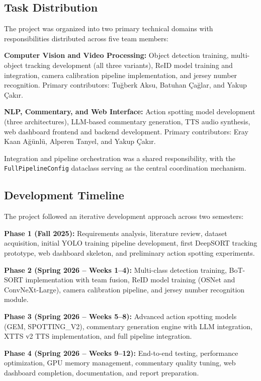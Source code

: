 \documentclass[10pt,twocolumn,a4paper]{article}
\begin{document}
\subsection{Task Distribution}

The project was organized into two primary technical domains with responsibilities distributed across five team members:

\textbf{Computer Vision and Video Processing:} Object detection training, multi-object tracking development (all three variants), ReID model training and integration, camera calibration pipeline implementation, and jersey number recognition. Primary contributors: Tu\u{g}berk Aksu, Batuhan \c{C}a\u{g}lar, and Yakup \c{C}ak{\i}r.

\textbf{NLP, Commentary, and Web Interface:} Action spotting model development (three architectures), LLM-based commentary generation, TTS audio synthesis, web dashboard frontend and backend development. Primary contributors: Eray Kaan A\u{g}\"unl\"u, Alperen Tanyel, and Yakup \c{C}ak{\i}r.

Integration and pipeline orchestration was a shared responsibility, with the \texttt{FullPipelineConfig} dataclass serving as the central coordination mechanism.

\subsection{Development Timeline}

The project followed an iterative development approach across two semesters:

\textbf{Phase 1 (Fall 2025):} Requirements analysis, literature review, dataset acquisition, initial YOLO training pipeline development, first DeepSORT tracking prototype, web dashboard skeleton, and preliminary action spotting experiments.

\textbf{Phase 2 (Spring 2026 -- Weeks 1--4):} Multi-class detection training, BoT-SORT implementation with team fusion, ReID model training (OSNet and ConvNeXt-Large), camera calibration pipeline, and jersey number recognition module.

\textbf{Phase 3 (Spring 2026 -- Weeks 5--8):} Advanced action spotting models (GEM, SPOTTING\_V2), commentary generation engine with LLM integration, XTTS v2 TTS implementation, and full pipeline integration.

\textbf{Phase 4 (Spring 2026 -- Weeks 9--12):} End-to-end testing, performance optimization, GPU memory management, commentary quality tuning, web dashboard completion, documentation, and report preparation.
\end{document}
